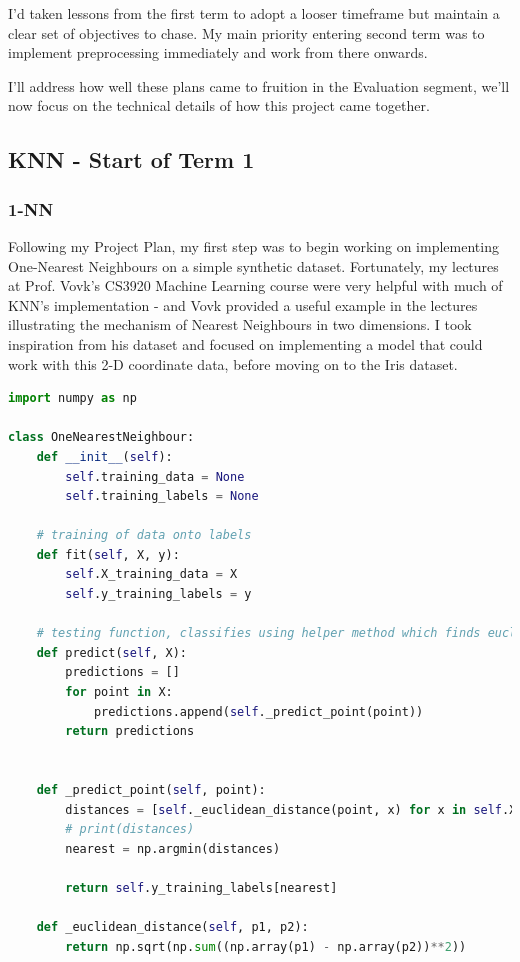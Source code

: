 \documentclass[letterpaper,10pt]{article}
\begin{document}
I'd taken lessons from the first term to adopt a looser timeframe but maintain a clear set of objectives to chase. My main priority entering second term was to implement preprocessing immediately and work from there onwards.\par
I'll address how well these plans came to fruition in the Evaluation segment, we'll now focus on the technical details of how this project came together. \par

\subsection{KNN - Start of Term 1}
\subsubsection{1-NN}
Following my Project Plan, my first step was to begin working on implementing One-Nearest Neighbours on a simple synthetic dataset. Fortunately, my lectures at Prof. Vovk's CS3920 Machine Learning course were very helpful with much of KNN's implementation - and Vovk provided a useful example in the lectures illustrating the mechanism of Nearest Neighbours in two dimensions. I took inspiration from his dataset and focused on implementing a model that could work with this 2-D coordinate data, before moving on to the Iris dataset.


\begin{lstlisting}[language=Python, caption=one\_nn.py]
    import numpy as np

class OneNearestNeighbour:
    def __init__(self):
        self.training_data = None
        self.training_labels = None

    # training of data onto labels
    def fit(self, X, y):
        self.X_training_data = X
        self.y_training_labels = y
    
    # testing function, classifies using helper method which finds euclidean distance
    def predict(self, X):
        predictions = []
        for point in X:
            predictions.append(self._predict_point(point))
        return predictions
    

    def _predict_point(self, point):
        distances = [self._euclidean_distance(point, x) for x in self.X_training_data]
        # print(distances)
        nearest = np.argmin(distances)

        return self.y_training_labels[nearest]

    def _euclidean_distance(self, p1, p2):
        return np.sqrt(np.sum((np.array(p1) - np.array(p2))**2))
\end{lstlisting}
\end{document}
